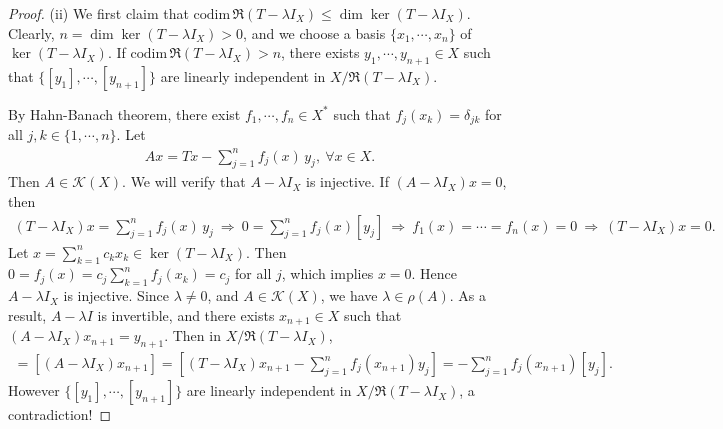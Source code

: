 \documentclass{article}
\begin{document}
\begin{proof}
(ii) We first claim that $\mathrm{codim}\,\mathfrak{R}(T-\lambda I_X)\leq\dim\ker(T-\lambda I_X)$. Clearly, $n=\dim\ker(T-\lambda I_X)>0$, and we choose a basis $\{x_1,\cdots,x_n\}$ of $\ker(T-\lambda I_X)$. If $\mathrm{codim}\,\mathfrak{R}(T-\lambda I_X)>n$, there exists $y_1,\cdots,y_{n+1}\in X$ such that $\{[y_1],\cdots,[y_{n+1}]\}$ are linearly independent in $X/\mathfrak{R}(T-\lambda I_X)$. 

By Hahn-Banach theorem, there exist $f_1,\cdots,f_n\in X^*$ such that $f_j(x_k)=\delta_{jk}$ for all $j,k\in\{1,\cdots,n\}$. Let 
\begin{align*}
	Ax= Tx - \sum_{j=1}^n f_j(x)\,y_j,\ \forall x\in X.
\end{align*}
Then $A\in\mathcal{K}(X)$. We will verify that $A-\lambda I_X$ is injective. If $(A-\lambda I_X)x=0$, then
\begin{align*}
	(T-\lambda I_X) x = \sum_{j=1}^n f_j(x)\,y_j\ \Rightarrow\ 0=\sum_{j=1}^n f_j(x)[y_j]\ \Rightarrow\ f_1(x)=\cdots=f_n(x)=0\ \Rightarrow\ (T-\lambda I_X)x=0.
\end{align*}
Let $x=\sum_{k=1}^n c_kx_k\in\ker(T-\lambda I_X)$. Then $0=f_j(x) = c_j\sum_{k=1}^n f_j(x_k) = c_j$ for all $j$, which implies $x=0$. Hence $A-\lambda I_X$ is injective. Since $\lambda\neq 0$, and $A\in\mathcal{K}(X)$, we have $\lambda\in\rho(A)$. As a result, $A-\lambda I$ is invertible, and there exists $x_{n+1}\in X$ such that $(A-\lambda I_X)x_{n+1} = y_{n+1}$. Then in $X/\mathfrak{R}(T-\lambda I_X)$,
\begin{align*}
	[y_{n+1}] = \left[(A-\lambda I_X)x_{n+1}\right] = \left[(T-\lambda I_X) x_{n+1} - \sum_{j=1}^n f_j(x_{n+1})y_j\right] = -\sum_{j=1}^n f_j(x_{n+1})[y_j].
\end{align*}
However $\{[y_1],\cdots,[y_{n+1}]\}$ are linearly independent in $X/\mathfrak{R}(T-\lambda I_X)$, a contradiction!


\end{proof}
\end{document}
